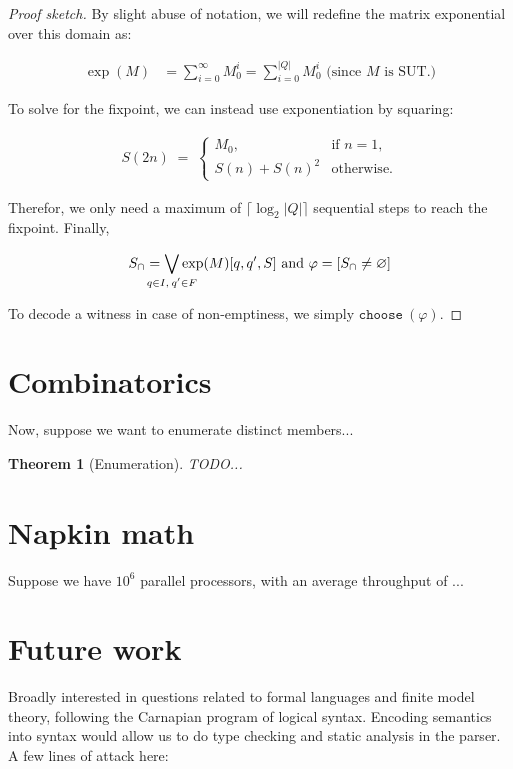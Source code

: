\documentclass[11pt]{article}
\theoremstyle{plain}
\newtheorem{theorem}{Theorem}
\theoremstyle{definition}
\begin{document}
\begin{proof}[Proof sketch]
\noindent By slight abuse of notation, we will redefine the matrix exponential over this domain as:

\begin{align}
  \exp(M) &= \sum_{i = 0}^\infty M_0^i = \sum_{i = 0}^{|Q|} M_0^i \text { (since $M$ is SUT.)}
\end{align}

\noindent To solve for the fixpoint, we can instead use exponentiation by squaring:

\begin{align}
  S(2n) \;=\; \begin{cases}
    M_0, & \text{if } n = 1,\\[6pt]
    S(n) + S(n)^2 & \text{otherwise}.
  \end{cases}
\end{align}

\noindent Therefor, we only need a maximum of $\lceil\log_2 |Q|\rceil$ sequential steps to reach the fixpoint. Finally,

\begin{align}
  S_\cap = \bigvee_{\mathclap{q \in I,\:q' \in F}}\exp(M)[q, q', S] \text{ and } \varphi = [S_\cap \neq \varnothing]
\end{align}

\noindent To decode a witness in case of non-emptiness, we simply $\texttt{choose}\:(\varphi)$.
\end{proof}
\clearpage

\section{Combinatorics}

Now, suppose we want to enumerate distinct members...

\begin{theorem}[Enumeration]
  TODO...
\end{theorem}

\section{Napkin math}

Suppose we have $10^6$ parallel processors, with an average throughput of ...

\section{Future work}

Broadly interested in questions related to formal languages and finite model theory, following the Carnapian program of logical syntax. Encoding semantics into syntax would allow us to do type checking and static analysis in the parser. A few lines of attack here:
\end{document}
